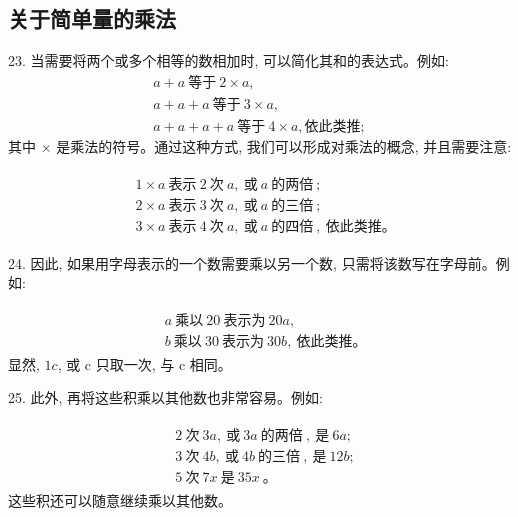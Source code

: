 \subsection{关于简单量的乘法}
\par
23. 当需要将两个或多个相等的数相加时, 可以简化其和的表达式。例如: 
\begin{gather*}
	a + a \ \text{等于}\  2 \times a, \\
	a + a + a \ \text{等于}\  3 \times a, \\
	a + a + a + a \ \text{等于}\  4 \times a, \text{依此类推}; 
\end{gather*}
其中 $\times$ 是乘法的符号。通过这种方式, 我们可以形成对乘法的概念, 并且需要注意: \par
\begin{gather*}
\begin{aligned}
&1 \times a \ \text{表示}\  2 \ \text{次}\  a, \ \text{或}\  a \ \text{的两倍}\ ;\\
&2 \times a \ \text{表示}\  3 \ \text{次}\  a, \ \text{或}\  a \ \text{的三倍}\ ;\\
&3 \times a \ \text{表示}\  4 \ \text{次}\  a, \ \text{或}\  a \ \text{的四倍}\ , \ \text{依此类推。}
\end{aligned}
\end{gather*}
\par
24. 因此, 如果用字母表示的一个数需要乘以另一个数, 只需将该数写在字母前。例如: \par
\begin{gather*}
\begin{aligned}
&a \ \text{乘以}\  20 \ \text{表示为}\  20a,\\
&b \ \text{乘以}\  30 \ \text{表示为}\  30b, \ \text{依此类推。}
\end{aligned}
\end{gather*}
显然, $1c$, 或 c 只取一次, 与 c 相同。
\par
25. 此外, 再将这些积乘以其他数也非常容易。例如: \par
\begin{gather*}
\begin{aligned}
&2 \ \text{次}\  3a, \ \text{或}\  3a \ \text{的两倍}\ , \ \text{是}\  6a;\\
&3 \ \text{次}\  4b, \ \text{或}\  4b \ \text{的三倍}\ , \ \text{是}\  12b;\\
&5 \ \text{次}\  7x \ \text{是}\  35x\ \text{。}
\end{aligned}
\end{gather*}
这些积还可以随意继续乘以其他数。
\par
